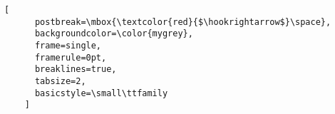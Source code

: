
\added[id=5th]{
}

\deleted[id=5th]{
}

\replaced[id=5th]{}{
}


  \par\bigskip
  \centering
  \begin{minipage}{0.9\columnwidth}
    \caption[]{
    }
    \label{}
  \end{minipage}
  
\FloatBarrier

    \centering
    \begin{minipage}{0.9\columnwidth}
      \begin{lstlisting}[frame=lines,breaklines=true,basicstyle=\small\ttfamily]
      \end{lstlisting}
    \end{minipage}


\begin{minipage}{0.9\columnwidth}
  \begin{lstlisting}[
      postbreak=\mbox{\textcolor{red}{$\hookrightarrow$}\space},
      backgroundcolor=\color{mygrey},
      frame=single,
      framerule=0pt,
      breaklines=true,
      tabsize=2,
      basicstyle=\small\ttfamily
    ]

  \end{lstlisting}
\end{minipage}




\added[id=3rd]{
}

\deleted[id=3rd]{
}

\replaced[id=3rd]{}{}

